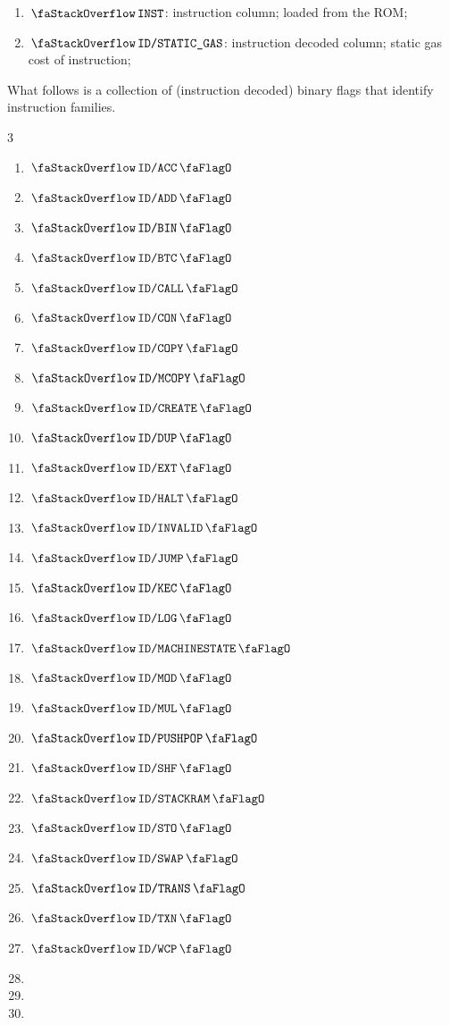 \begin{enumerate}[resume]
	\item $\stackInst$:
		instruction column; loaded from the ROM;
	\item $\stackStaticGas$:
		instruction decoded column;
		static gas cost of instruction;
\end{enumerate}
What follows is a collection of (instruction decoded) binary flags that identify instruction families.
\begin{multicols}{3}
	\begin{enumerate}[resume]
		\item $\stackDecAccFlag$
		\item $\stackDecAddFlag$
		\item $\stackDecBinFlag$
		\item $\stackDecBtcFlag$
		\item $\stackDecCallFlag$
		\item $\stackDecConFlag$
		\item $\stackDecCopyFlag$
		\item $\stackDecMcopyFlag$
		\item $\stackDecCreateFlag$
		\item $\stackDecDupFlag$
		\item $\stackDecExtFlag$
		\item $\stackDecHaltFlag$
		\item $\stackDecInvalidFlag$
		\item $\stackDecJumpFlag$
		\item $\stackDecKecFlag$
		\item $\stackDecLogFlag$
		\item $\stackDecMachineStateFlag$
		\item $\stackDecModFlag$
		\item $\stackDecMulFlag$
		\item $\stackDecPushPopFlag$
		\item $\stackDecShfFlag$
		\item $\stackDecStackRamFlag$
		\item $\stackDecStoFlag$
		\item $\stackDecSwapFlag$
		\item $\stackDecTransFlag$
		\item $\stackDecTxnFlag$
		\item $\stackDecWcpFlag$
		\item[\vspace{\fill}]
		\item[\vspace{\fill}]
		\item[\vspace{\fill}]
	\end{enumerate}
\end{multicols}
